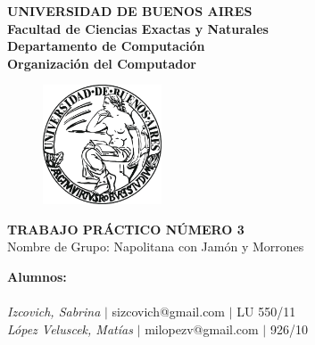 \documentclass[10pt, a4paper]{article}
\begin{document}
\thispagestyle{empty}
\begin{center}

\Huge{ \bf{UNIVERSIDAD DE BUENOS AIRES}}
\\
\LARGE{\bf{Facultad de Ciencias Exactas y Naturales}}
\\
\textbf{Departamento de Computaci\'on}
\\
\textbf{Organizaci\'on del Computador}
\vspace{2.0\baselineskip}
\end{center}


\begin{figure}[h] %
\begin{center}
\includegraphics[width=100pt]{./image.jpeg}
\end{center}
\end{figure}
\begin{center}
\vspace*{0.7cm}

\huge{\bf TRABAJO PR\'ACTICO N\'UMERO 3}\\
\huge{Nombre de Grupo: Napolitana con Jam\'on y Morrones}
\vspace*{8cm}

\end{center}

\huge{\textbf{Alumnos:}}\\
\\
\vspace*{0.3cm}
\Large{\textsl{Izcovich, Sabrina} $|$ sizcovich@gmail.com $|$ LU 550/11}\\
\vspace*{0.3cm}
\Large{\textsl{L\'opez Veluscek, Matías} \hspace{0.1cm}$|$ milopezv@gmail.com $|$ 926/10}\\
\vspace*{0.3cm}
\vspace{0.5cm}
 
\newpage
\thispagestyle{empty}
\tableofcontents
\newpage
\end{document}
